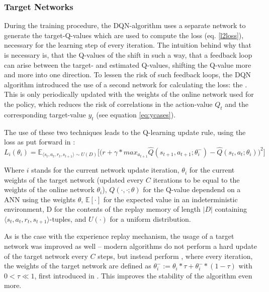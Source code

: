 \subsubsection*{Target Networks}
During the training procedure, the DQN-algorithm uses a separate network to generate the target-Q-values which are used to compute the loss (eq. \ref{l2loss}), necessary for the learning step of every iteration. The intuition behind why that is necessary is, that the Q-values of the  shift in such a way, that a feedback loop can arise between the target- and estimated Q-values, shifting the Q-value more and more into one direction. %
To lessen the risk of such feedback loops, the DQN algorithm introduced the use of a second network for calculating the loss: the . This is only periodically updated with the weights of the online network used for the policy, which reduces the risk of correlations in the action-value $Q_t$ and the corresponding target-value $y_t$ (see equation \ref{eq:ycases}).

The use of these two techniques leads to the Q-learning update rule, using the loss as put forward in \cite{mnih_human-level_2015}:
\begin{equation} \label{qloss_target}
	L_i(\theta_i) = \mathds{E}_{\langle s_t,a_t,r_t,s_{t+1} \rangle \sim U(D)} \Bigg[\Big( r + \gamma * max_{a_{t+1}} \hat{Q}(s_{t+1}, a_{t+1}; \theta^-_i) - \hat{Q}(s_t,a_t;\theta_i) \Big)^2\Bigg]
\end{equation}
\begin{flushright}
	\scriptsize
	Where $i$ stands for the current network update iteration, $\theta_i$ for the current weights of the target network (updated every $C$ iterations to be equal to the weights of the online network $\theta_i$), $Q(\cdot,\cdot;\theta)$ for the Q-value dependend on a ANN using the weights $\theta$, $\mathds{E}[\cdot]$ for the expected value in an indeterministic environment, D for the contents of the replay memory of length $\lvert D \rvert$ containing $\langle s_t,a_t,r_t,s_{t+1} \rangle$-tuples, and $U(\cdot)$ for a uniform distribution.
\end{flushright}
As is the case with the experience replay mechanism, the usage of a target network was improved as well -- modern algorithms do not perform a hard update of the target network every $C$ steps, but instead perform , where every iteration, the weights of the target network are defined as $\theta^-_i := \theta_i * \tau + \theta^-_i * (1-\tau)$ with $0 < \tau \ll 1$, first introduced in \cite{lillicrap_continuous_2015}. This improves the stability of the algorithm even more.\\

